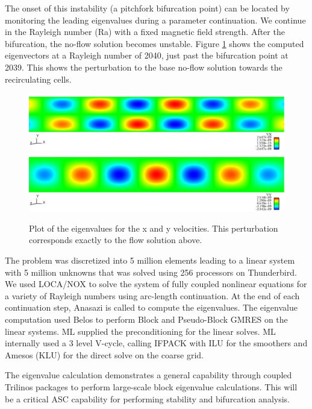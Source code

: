 \documentclass[pdf,ps2pdf,11pt]{SANDreport}
\begin{document}
The onset of this instability (a pitchfork bifurcation point) can be located
by monitoring the leading eigenvalues during a parameter continuation.  We
continue in the Rayleigh number (Ra) with a fixed magnetic field strength.
After the bifurcation, the no-flow solution becomes unstable. Figure
\ref{fig:hrbEigenvalues} shows the computed eigenvectors at a Rayleigh number
of 2040, just past the bifurcation point at 2039.  This shows the perturbation
to the base no-flow solution towards the recirculating cells.

{\bsinglespace
\begin{figure}
\begin{center}
\includegraphics*[angle=0,scale=0.30]{figures/ms_eigenvalue_vx.eps}
\includegraphics*[angle=0,scale=0.30]{figures/ms_eigenvalue_vy.eps}
\end{center}
\caption[Eigenvalues for the hydromagnetic Rayleigh-Bernard problem]{
\label{fig:hrbEigenvalues}
Plot of the eigenvalues for the x and y velocities.  This perturbation
corresponds exactly to the flow solution above.}
\end{figure}
\esinglespace}
 
The problem was discretized into 5 million elements leading to a linear system
with 5 million unknowns that was solved using 256 processors on Thunderbird.  We
used LOCA/NOX to solve the system of fully coupled nonlinear equations for a
variety of Rayleigh numbers using arc-length continuation.  At the end of each
continuation step, Anasazi is called to compute the eigenvalues.  The
eigenvalue computation used Belos to perform Block and Pseudo-Block GMRES on
the linear systems.  ML supplied the preconditioning for the linear solves.
ML internally used a 3 level V-cycle, calling IFPACK with ILU for the
smoothers and Amesos (KLU) for the direct solve on the coarse grid.

The eigenvalue calculation demonstrates a general capability through coupled
Trilinos packages to perform large-scale block eigenvalue calculations.  This
will be a critical ASC capability for performing stability and bifurcation
analysis.
\end{document}
